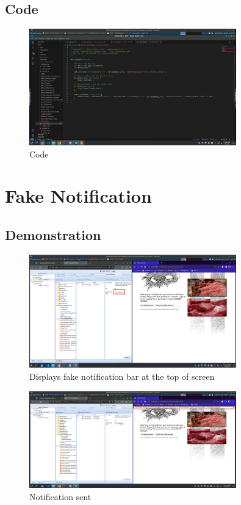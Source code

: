 \documentclass{report}
\begin{document}
\subsection{Code}
\begin{figure}[!htbp]
    \centering
    \includegraphics[width=0.8\textwidth]{TabNabbing/code.png}
    \caption{Code}
    \label{fig:tn2}
\end{figure}

\pagebreak

\section{Fake Notification}
\subsection{Demonstration}

\begin{figure}[!htbp]
    \centering
    \includegraphics[width=0.8\textwidth]{Fake Notification Bar/1.png}
    \caption{Displays fake notification bar at the top of screen}
    \label{fig:fn1}
\end{figure}

\begin{figure}[!htbp]
    \centering
    \includegraphics[width=0.8\textwidth]{Fake Notification Bar/2.png}
    \caption{Notification sent}
    \label{fig:fn2}
\end{figure}
\end{document}
